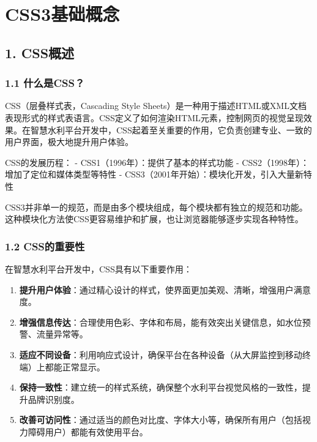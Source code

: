 \section{CSS3基础概念}\label{css3ux57faux7840ux6982ux5ff5}

\subsection{1. CSS概述}\label{cssux6982ux8ff0}

\subsubsection{1.1 什么是CSS？}\label{ux4ec0ux4e48ux662fcss}

CSS（层叠样式表，Cascading Style
Sheets）是一种用于描述HTML或XML文档表现形式的样式表语言。CSS定义了如何渲染HTML元素，控制网页的视觉呈现效果。在智慧水利平台开发中，CSS起着至关重要的作用，它负责创建专业、一致的用户界面，极大地提升用户体验。

CSS的发展历程： - CSS1（1996年）：提供了基本的样式功能 -
CSS2（1998年）：增加了定位和媒体类型等特性 -
CSS3（2001年开始）：模块化开发，引入大量新特性

CSS3并非单一的规范，而是由多个模块组成，每个模块都有独立的规范和功能。这种模块化方法使CSS更容易维护和扩展，也让浏览器能够逐步实现各种特性。

\subsubsection{1.2 CSS的重要性}\label{cssux7684ux91cdux8981ux6027}

在智慧水利平台开发中，CSS具有以下重要作用：

\begin{enumerate}
\def\labelenumi{\arabic{enumi}.}
\tightlist
\item
  \textbf{提升用户体验}：通过精心设计的样式，使界面更加美观、清晰，增强用户满意度。
\item
  \textbf{增强信息传达}：合理使用色彩、字体和布局，能有效突出关键信息，如水位预警、流量异常等。
\item
  \textbf{适应不同设备}：利用响应式设计，确保平台在各种设备（从大屏监控到移动终端）上都能正常显示。
\item
  \textbf{保持一致性}：建立统一的样式系统，确保整个水利平台视觉风格的一致性，提升品牌识别度。
\item
  \textbf{改善可访问性}：通过适当的颜色对比度、字体大小等，确保所有用户（包括视力障碍用户）都能有效使用平台。
\end{enumerate}

